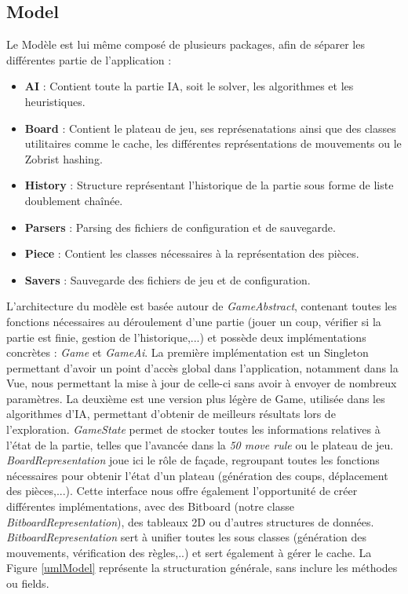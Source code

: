 \documentclass{article}
\begin{document}
\subsection{Model}
Le Modèle est lui même composé de plusieurs packages, afin de séparer les différentes partie de l'application :
\begin{itemize}
    \item \textbf{AI} : Contient toute la partie IA, soit le solver, les algorithmes et les heuristiques.
    \item \textbf{Board} : Contient le plateau de jeu, ses représenatations ainsi que des classes utilitaires comme le cache,
    les différentes représentations de mouvements ou le Zobrist hashing.
    \item \textbf{History} : Structure représentant l'historique de la partie sous forme de liste doublement chaînée.
    \item \textbf{Parsers} : Parsing des fichiers de configuration et de sauvegarde.
    \item \textbf{Piece} : Contient les classes nécessaires à la représentation des pièces.
    \item \textbf{Savers} : Sauvegarde des fichiers de jeu et de configuration.
\end{itemize}

L'architecture du modèle est basée autour de \textit{GameAbstract}, contenant toutes les fonctions nécessaires au déroulement d'une partie 
(jouer un coup, vérifier si la partie est finie, gestion de l'historique,...) et possède deux implémentations concrètes : \textit{Game} et \textit{GameAi}.
La première implémentation est un Singleton permettant d'avoir un point d'accès global dans l'application, notamment dans la Vue, nous permettant la mise à jour de celle-ci sans avoir à envoyer de nombreux paramètres.
La deuxième est une version plus légère de Game, utilisée dans les algorithmes d'IA, permettant d'obtenir de meilleurs résultats lors de l'exploration.
\textit{GameState} permet de stocker toutes les informations relatives à l'état de la partie, telles que l'avancée dans la \textit{50 move rule} ou le plateau de jeu.
\textit{BoardRepresentation} joue ici le rôle de façade, regroupant toutes les fonctions nécessaires pour obtenir l'état d'un plateau (génération des coups, déplacement des pièces,...).
Cette interface nous offre également l'opportunité de créer différentes implémentations, avec des Bitboard (notre classe \textit{BitboardRepresentation}), des tableaux 2D ou d'autres structures de données.
\textit{BitboardRepresentation} sert à unifier toutes les sous classes (génération des mouvements, vérification des règles,..) et sert également à gérer le cache.
La Figure \ref{umlModel} représente la structuration générale, sans inclure les méthodes ou fields.
\end{document}
